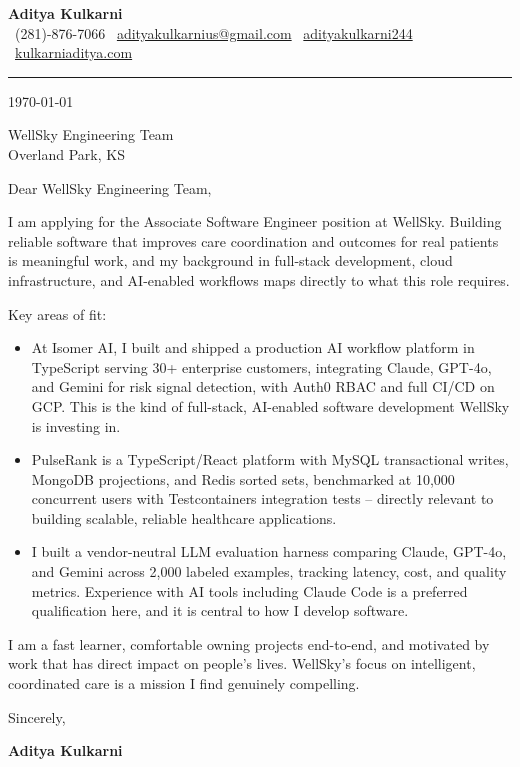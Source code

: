 \documentclass[11pt,a4paper]{article}
\makeatletter
\newcommand{\CLheader}{%
  \begin{center}
    {\Large \textbf{Aditya Kulkarni}}\\[4pt]
    \textcolor{brand}{\faPhone}\ (281)-876-7066 \quad
    \textcolor{brand}{\faEnvelope}\ \href{mailto:adityakulkarnius@gmail.com}{adityakulkarnius@gmail.com} \quad
    \textcolor{brand}{\faLinkedin}\ \href{https://linkedin.com/in/adityakulkarni244}{adityakulkarni244} \quad
    \textcolor{brand}{\faGlobe}\ \href{https://kulkarniaditya.com}{kulkarniaditya.com}
  \end{center}
  \vspace{4pt}
  \textcolor{brand}{\rule{\linewidth}{1.2pt}}
  \vspace{6pt}
}
\makeatother
\begin{document}
\CLheader

\today

\vspace{8pt}

WellSky Engineering Team\\
Overland Park, KS

\vspace{8pt}

Dear WellSky Engineering Team,

\vspace{6pt}

I am applying for the Associate Software Engineer position at WellSky. Building reliable software that improves care coordination and outcomes for real patients is meaningful work, and my background in full-stack development, cloud infrastructure, and AI-enabled workflows maps directly to what this role requires.

\vspace{6pt}

Key areas of fit:

\vspace{4pt}
\begin{itemize}
  \item[\textcolor{brand}{\faAngleRight}] At Isomer AI, I built and shipped a production AI workflow platform in TypeScript serving 30+ enterprise customers, integrating Claude, GPT-4o, and Gemini for risk signal detection, with Auth0 RBAC and full CI/CD on GCP. This is the kind of full-stack, AI-enabled software development WellSky is investing in.
  \item[\textcolor{brand}{\faAngleRight}] PulseRank is a TypeScript/React platform with MySQL transactional writes, MongoDB projections, and Redis sorted sets, benchmarked at 10,000 concurrent users with Testcontainers integration tests -- directly relevant to building scalable, reliable healthcare applications.
  \item[\textcolor{brand}{\faAngleRight}] I built a vendor-neutral LLM evaluation harness comparing Claude, GPT-4o, and Gemini across 2,000 labeled examples, tracking latency, cost, and quality metrics. Experience with AI tools including Claude Code is a preferred qualification here, and it is central to how I develop software.
\end{itemize}

\vspace{6pt}

I am a fast learner, comfortable owning projects end-to-end, and motivated by work that has direct impact on people's lives. WellSky's focus on intelligent, coordinated care is a mission I find genuinely compelling.

\vspace{12pt}

Sincerely,

\vspace{6pt}
\textbf{Aditya Kulkarni}
\end{document}
